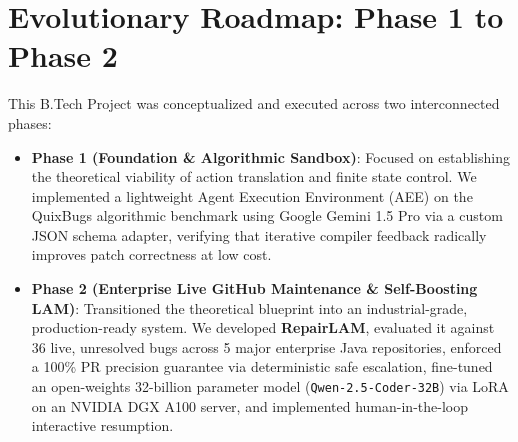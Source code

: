 \documentclass[12pt,a4paper]{report}
\begin{document}
\section{Evolutionary Roadmap: Phase 1 to Phase 2}
This B.Tech Project was conceptualized and executed across two interconnected phases:
\begin{itemize}
    \item \textbf{Phase 1 (Foundation \& Algorithmic Sandbox)}: Focused on establishing the theoretical viability of action translation and finite state control. We implemented a lightweight Agent Execution Environment (AEE) on the QuixBugs algorithmic benchmark using Google Gemini 1.5 Pro via a custom JSON schema adapter, verifying that iterative compiler feedback radically improves patch correctness at low cost.
    \item \textbf{Phase 2 (Enterprise Live GitHub Maintenance \& Self-Boosting LAM)}: Transitioned the theoretical blueprint into an industrial-grade, production-ready system. We developed \textbf{RepairLAM}, evaluated it against 36 live, unresolved bugs across 5 major enterprise Java repositories, enforced a 100\% PR precision guarantee via deterministic safe escalation, fine-tuned an open-weights 32-billion parameter model (\texttt{Qwen-2.5-Coder-32B}) via LoRA on an NVIDIA DGX A100 server, and implemented human-in-the-loop interactive resumption.
\end{itemize}
\end{document}
